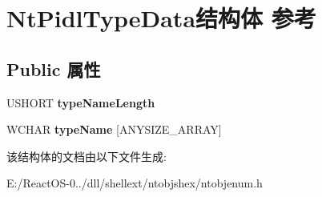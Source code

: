 \hypertarget{struct_nt_pidl_type_data}{}\section{Nt\+Pidl\+Type\+Data结构体 参考}
\label{struct_nt_pidl_type_data}
\subsection*{Public 属性}
\begin{DoxyCompactItemize}
\item 
\mbox{\label{struct_nt_pidl_type_data_ab0656a280f3adcdeb1715b7d5e76e114}} 
U\+S\+H\+O\+RT {\bfseries type\+Name\+Length}
\item 
\mbox{\label{struct_nt_pidl_type_data_a0f114e9ee1010d8fc5e0b7e48cfa09a5}} 
W\+C\+H\+AR {\bfseries type\+Name} \mbox{[}A\+N\+Y\+S\+I\+Z\+E\+\_\+\+A\+R\+R\+AY\mbox{]}
\end{DoxyCompactItemize}


该结构体的文档由以下文件生成\+:\begin{DoxyCompactItemize}
\item 
E\+:/\+React\+O\+S-\/0../dll/shellext/ntobjshex/ntobjenum.\+h\end{DoxyCompactItemize}
